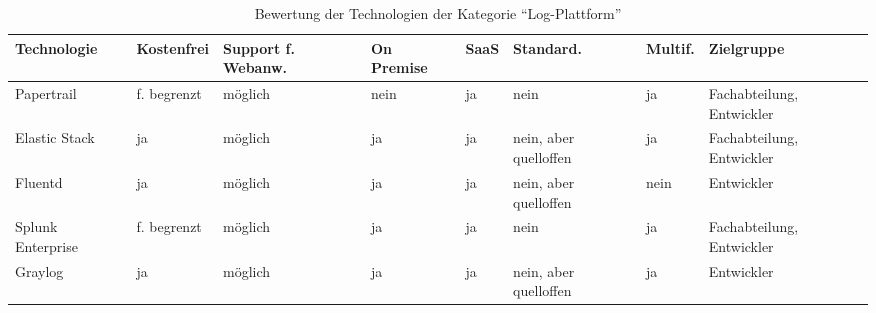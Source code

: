 \begin{table}[H]%
\centering
\addtolength{\leftskip}{-2cm}
\addtolength{\rightskip}{-2cm}
\begin{tabular}{|p{3.05cm}|p{1.8cm}|p{1.7cm}|p{1.2cm}|p{1.3cm}|p{1.7cm}|p{1.3cm}|p{2.6cm}|}
\hline
Technologie & Kostenfrei & Support f. Webanw. & On \mbox{Premise} & SaaS & Standard. & Multif. & Zielgruppe \\
\hline
Papertrail & f. begrenzt & möglich & nein & ja & nein & ja & Fachabteilung, Entwickler \\
\hline
Elastic Stack & ja & möglich & ja & ja & nein, aber quelloffen & ja & Fachabteilung, Entwickler \\
\hline
Fluentd & ja & möglich & ja & ja & nein, aber quelloffen & nein & Entwickler \\
\hline
Splunk \mbox{Enterprise} & f. begrenzt & möglich & ja & ja & nein & ja & Fachabteilung, Entwickler \\
\hline
Graylog & ja & möglich & ja & ja & nein, aber quelloffen & ja & Entwickler \\
\hline
\end{tabular}
\caption{Bewertung der Technologien der Kategorie \enquote{Log-Plattform}}
\label{tab:technologie-bewertung-log-plattform}
\end{table}
